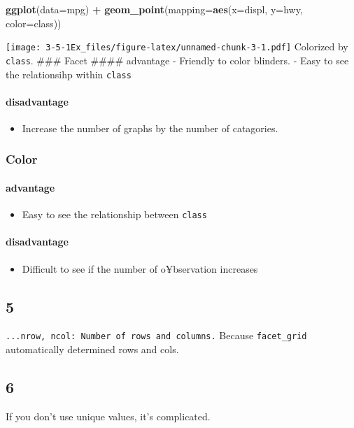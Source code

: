 \documentclass[]{article}
\newenvironment{Shaded}{\begin{snugshade}}{\end{snugshade}}
\newcommand{\DataTypeTok}[1]{\textcolor[rgb]{0.13,0.29,0.53}{#1}}
\newcommand{\KeywordTok}[1]{\textcolor[rgb]{0.13,0.29,0.53}{\textbf{#1}}}
\newcommand{\NormalTok}[1]{#1}
\newcommand{\OperatorTok}[1]{\textcolor[rgb]{0.81,0.36,0.00}{\textbf{#1}}}
\newcommand{\StringTok}[1]{\textcolor[rgb]{0.31,0.60,0.02}{#1}}
\providecommand{\tightlist}{%
  \setlength{\itemsep}{0pt}\setlength{\parskip}{0pt}}
\let\oldparagraph\paragraph
\renewcommand{\paragraph}[1]{\oldparagraph{#1}\mbox{}}
\begin{document}
\begin{Shaded}
\begin{Highlighting}[]
\KeywordTok{ggplot}\NormalTok{(}\DataTypeTok{data=}\NormalTok{mpg) }\OperatorTok{+}
\StringTok{    }\KeywordTok{geom_point}\NormalTok{(}\DataTypeTok{mapping=}\KeywordTok{aes}\NormalTok{(}\DataTypeTok{x=}\NormalTok{displ, }\DataTypeTok{y=}\NormalTok{hwy, }\DataTypeTok{color=}\NormalTok{class))}
\end{Highlighting}
\end{Shaded}

\texttt{[image: 3-5-1Ex\_files/figure-latex/unnamed-chunk-3-1.pdf]}
Colorized by \texttt{class}. \#\#\# Facet \#\#\#\# advantage - Friendly
to color blinders. - Easy to see the relationsihp within \texttt{class}

\hypertarget{disadvantage}{%
\paragraph{disadvantage}\label{disadvantage}}

\begin{itemize}
\tightlist
\item
  Increase the number of graphs by the number of catagories.
\end{itemize}

\hypertarget{color}{%
\subsubsection{Color}\label{color}}

\hypertarget{advantage}{%
\paragraph{advantage}\label{advantage}}

\begin{itemize}
\tightlist
\item
  Easy to see the relationship between \texttt{class}
\end{itemize}

\hypertarget{disadvantage-1}{%
\paragraph{disadvantage}\label{disadvantage-1}}

\begin{itemize}
\tightlist
\item
  Difficult to see if the number of o¥bservation increases
\end{itemize}

\hypertarget{section-5}{%
\subsection{5}\label{section-5}}

\texttt{...nrow,\ ncol:\ Number\ of\ rows\ and\ columns.} Because
\texttt{facet\_grid} automatically determined rows and cols.

\hypertarget{section-6}{%
\subsection{6}\label{section-6}}

If you don't use unique values, it's complicated.
\end{document}
